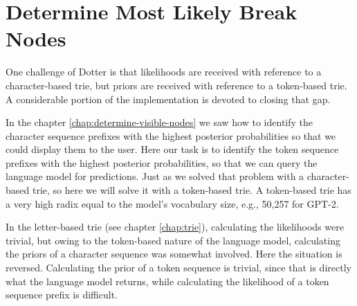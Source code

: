 \chapter{Determine Most Likely Break Nodes}
\label{chap:determine-most-likely-break-nodes}

One challenge of Dotter is that likelihoods are received with reference to a character-based trie,
but priors are received with reference to a token-based trie. A considerable portion of the implementation
is devoted to closing that gap.

In the chapter \ref{chap:determine-visible-nodes} we saw how to identify the character sequence prefixes with the highest
posterior probabilities so that we could display them to the user. Here our task is to identify the token sequence prefixes
with the highest posterior probabilities, so that we can query the language model for predictions.
Just as we solved that problem with a character-based trie, so here we will solve it with a token-based trie.
A token-based trie has a very high radix equal to the model's vocabulary size, e.g., 50,257 for GPT-2.

In the letter-based trie (see chapter \ref{chap:trie}), calculating the likelihoods were trivial, but owing to the token-based nature of the
language model, calculating the priors of a character sequence was somewhat involved. Here the situation is reversed.
Calculating the prior of a token sequence is trivial, since that is directly what the language model returns,
while calculating the likelihood of a token sequence prefix is difficult.
